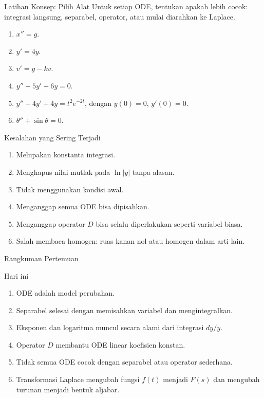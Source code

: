 \documentclass[aspectratio=169,11pt]{beamer}
\begin{document}
\begin{frame}{Latihan Konsep: Pilih Alat}
Untuk setiap ODE, tentukan apakah lebih cocok: integrasi langsung, separabel, operator, atau mulai diarahkan ke Laplace.
\begin{enumerate}
  \item $x''=g$.
  \item $y'=4y$.
  \item $v'=g-kv$.
  \item $y''+5y'+6y=0$.
  \item $y''+4y'+4y=t^2e^{-2t}$, dengan $y(0)=0$, $y'(0)=0$.
  \item $\theta''+\sin\theta=0$.
\end{enumerate}
\end{frame}

\begin{frame}{Kesalahan yang Sering Terjadi}
\begin{enumerate}
  \item Melupakan konstanta integrasi.
  \item Menghapus nilai mutlak pada $\ln|y|$ tanpa alasan.
  \item Tidak menggunakan kondisi awal.
  \item Menganggap semua ODE bisa dipisahkan.
  \item Menganggap operator $D$ bisa selalu diperlakukan seperti variabel biasa.
  \item Salah membaca homogen: ruas kanan nol atau homogen dalam arti lain.
\end{enumerate}
\end{frame}

\begin{frame}{Rangkuman Pertemuan}
\begin{block}{Hari ini}
\begin{enumerate}
  \item ODE adalah model perubahan.
  \item Separabel selesai dengan memisahkan variabel dan mengintegralkan.
  \item Eksponen dan logaritma muncul secara alami dari integrasi $dy/y$.
  \item Operator $D$ membantu ODE linear koefisien konstan.
  \item Tidak semua ODE cocok dengan separabel atau operator sederhana.
  \item Transformasi Laplace mengubah fungsi $f(t)$ menjadi $F(s)$ dan mengubah turunan menjadi bentuk aljabar.
\end{enumerate}
\end{block}
\end{frame}
\end{document}
